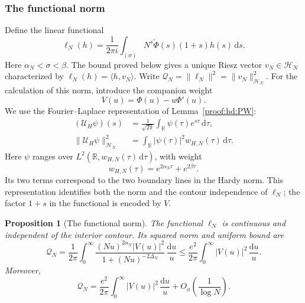 \documentclass[12pt,a4paper]{amsart}
\numberwithin{equation}{section}
\def\le{\leqslant}
\theoremstyle{plain}
\newtheorem{proposition}{Proposition}[section]
\theoremstyle{definition}
\theoremstyle{remark}
\begin{document}
\subsubsection{The functional norm}

Define the linear functional
\[
 \ell_N(h)=\frac1{2\pi i}\int_{(\sigma)}
       N^s\widetilde\Phi(s)(1+s)h(s)\,\mathrm{d}s.
\]
Here $\alpha_N<\sigma<\beta$. The bound proved below gives a
unique Riesz vector $v_N\in\mathcal H_N$ characterized by
$\ell_N(h)=\langle h,v_N\rangle$. Write
$\mathcal Q_N=\|\ell_N\|^2=\|v_N\|_{\mathcal H_N}^2$.
For the calculation of this norm, introduce the companion weight
\[
 V(u)=\Phi(u)-u\Phi'(u).
\]
We use the Fourier--Laplace representation
of Lemma~\ref{proof:hd:PW}:
\[
 \begin{aligned}
 (\mathcal U_H\psi)(s)
   &=\frac1{\sqrt{2\pi}}
       \int_{\mathbb R}\psi(\tau)e^{s\tau}\,\mathrm{d}\tau,\\
 \|\mathcal U_H\psi\|_{\mathcal H_N}^2
   &=\int_{\mathbb R}|\psi(\tau)|^2w_{H,N}(\tau)\,\mathrm{d}\tau.
 \end{aligned}
\]
Here $\psi$ ranges over $L^2(\mathbb R,w_{H,N}(\tau)\,\mathrm{d}\tau)$,
with weight
\[
 w_{H,N}(\tau)=e^{2\alpha_N\tau}+e^{2\beta\tau}.
\]
Its two terms correspond to the two boundary lines in the Hardy norm.
This representation identifies
both the norm and the contour independence of $\ell_N$; the factor
$1+s$ in the functional is encoded by $V$.

\begin{proposition}[The functional norm]\label{proof:bm:norm}
The functional $\ell_N$ is continuous and independent of the
interior contour. Its squared norm and uniform bound are
\begin{equation}\label{proof:hardy:functional-norm}
 \mathcal Q_N=\frac1{2\pi}\int_0^\infty
       \frac{(Nu)^{2\alpha_N}|V(u)|^2}
            {1+(Nu)^{-2\Delta_N}}\,\frac{\mathrm{d}u}{u}
 \le\frac{e^2}{2\pi}\int_0^\infty|V(u)|^2\,\frac{\mathrm{d}u}{u}.
\end{equation}
Moreover,
\begin{equation}\label{bm:norm-asymptotic}
 \mathcal Q_N
 =\frac{e^2}{2\pi}\int_0^\infty|V(u)|^2\,\frac{\mathrm{d}u}{u}
       +O_{\phi}\left(\frac1{\log N}\right).
\end{equation}
\end{proposition}
\end{document}
